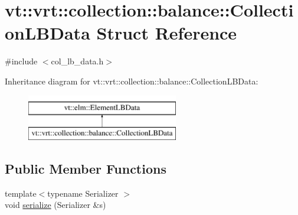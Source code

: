 \hypertarget{structvt_1_1vrt_1_1collection_1_1balance_1_1_collection_l_b_data}{}\section{vt\+:\+:vrt\+:\+:collection\+:\+:balance\+:\+:Collection\+L\+B\+Data Struct Reference}
\label{structvt_1_1vrt_1_1collection_1_1balance_1_1_collection_l_b_data}


{\ttfamily \#include $<$col\+\_\+lb\+\_\+data.\+h$>$}

Inheritance diagram for vt\+:\+:vrt\+:\+:collection\+:\+:balance\+:\+:Collection\+L\+B\+Data\+:\begin{figure}[H]
\begin{center}
\leavevmode
\includegraphics[height=2.000000cm]{structvt_1_1vrt_1_1collection_1_1balance_1_1_collection_l_b_data}
\end{center}
\end{figure}
\subsection*{Public Member Functions}
\begin{DoxyCompactItemize}
\item 
{\footnotesize template$<$typename Serializer $>$ }\\void \hyperlink{structvt_1_1vrt_1_1collection_1_1balance_1_1_collection_l_b_data_ae52e5a85cd0036616570d5cd725c0311}{serialize} (Serializer \&s)
\end{DoxyCompactItemize}
